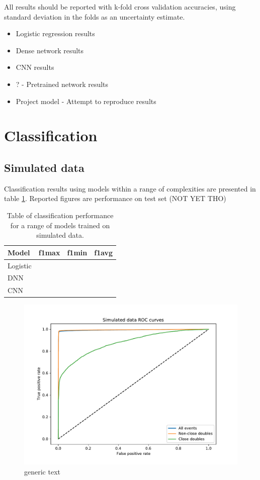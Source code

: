All results should be reported with k-fold cross validation accuracies, using
standard deviation in the folds as an uncertainty estimate.
\begin{itemize}
  \item Logistic regression results 
  \item Dense network results
  \item CNN results
  \item ? - Pretrained network results
  \item Project model - Attempt to reproduce results
\end{itemize}
\section{Classification}
\subsection{Simulated data}
Classification results using models within a range of complexities are presented in table \ref{tab:classification-sim}.
Reported figures are performance on test set (NOT YET THO)
\begin{table}
  \centering
  \begin{tabular}{|l|c|c|c|}
    Model     & f1max & f1min & f1avg \\
    \hline
    Logistic  &       &       &   \\
    DNN       &       &       &   \\
    CNN       &       &       &   \\
  \end{tabular}
  \caption{Table of classification performance for a range of models trained on simulated data.}
  \label{tab:classification-sim}
\end{table}




\begin{figure}
\centering
\includegraphics[width=0.8 \textwidth]{chapters/results/figures/roc_simulated.pdf}
\caption[Titletext]{generic text}\label{fig:roc_simulated}
\end{figure}

